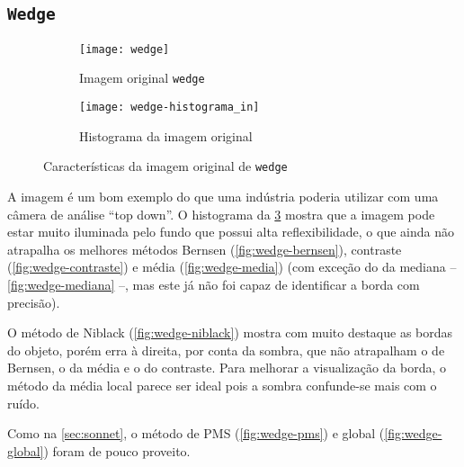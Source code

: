 \documentclass[brazilian,a4paper,twocolumn]{article}
\begin{document}
    \subsection{\texttt{Wedge}}
    \label{sec:wedge}

        \begin{figure}[h]
            \centering
            \begin{subfigure}{0.30\textwidth}
                \texttt{[image: wedge]}
                \caption{Imagem original \texttt{wedge}}
                \label{fig:wedge}
            \end{subfigure}
            \begin{subfigure}{0.5\textwidth}
                \texttt{[image: wedge-histograma\_in]}
                \caption{Histograma da imagem original}
                \label{fig:wedge-histograma}
            \end{subfigure}

            \caption{Características da imagem original de \texttt{wedge}}
        \end{figure}

        A imagem é um bom exemplo do que uma indústria poderia utilizar com uma câmera de análise ``top down''. O histograma da \cref{fig:wedge-histograma} mostra que a imagem pode estar muito iluminada pelo fundo que possui alta reflexibilidade, o que ainda não atrapalha os melhores métodos Bernsen (\cref{fig:wedge-bernsen}), contraste (\cref{fig:wedge-contraste}) e média (\cref{fig:wedge-media}) (com exceção do da mediana -- \cref{fig:wedge-mediana} --, mas este já não foi capaz de identificar a borda com precisão).

        O método de Niblack (\cref{fig:wedge-niblack}) mostra com muito destaque as bordas do objeto, porém erra à direita, por conta da sombra, que não atrapalham o de Bernsen, o da média e o do contraste. Para melhorar a visualização da borda, o método da média local parece ser ideal pois a sombra confunde-se mais com o ruído.

        Como na \cref{sec:sonnet}, o método de PMS (\cref{fig:wedge-pms}) e global (\cref{fig:wedge-global}) foram de pouco proveito.
\end{document}
